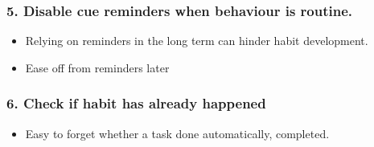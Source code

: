 \subsubsection*{5. Disable cue reminders when behaviour is routine.}
  \begin{itemize}
    \item Relying on reminders in the long term can hinder habit development.
    \item Ease off from reminders later
  \end{itemize}

\subsubsection*{6. Check if habit has already happened}
  \begin{itemize}
    \item Easy to forget whether a task done automatically, completed.
  \end{itemize}

